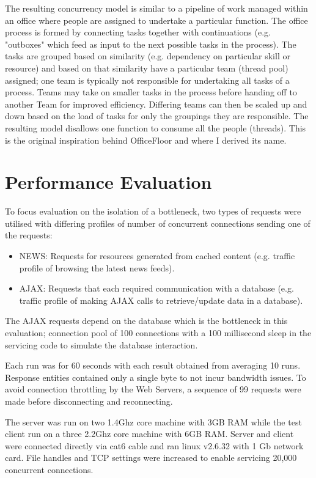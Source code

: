 \documentclass[conference]{ieee/IEEEtran}
\begin{document}
The resulting concurrency model is similar to a pipeline of work managed within
an office where people are assigned to undertake a particular function.
The office process is formed by connecting tasks together with continuations
(e.g. "outboxes" which feed as input to the next possible tasks in the process).
 The tasks are grouped based on similarity (e.g. dependency on particular skill
or resource) and based on that similarity have a particular team (thread pool)
assigned; one team is typically not responsible for undertaking all tasks of a
process.  Teams may take on smaller tasks in the process before handing off to
another Team for improved efficiency.  Differing teams can then be scaled up and
down based on the load of tasks for only the groupings they are responsible.
The resulting model disallows one function to consume all the people (threads).
This is the original inspiration behind OfficeFloor and where I derived its
name.



\section{Performance Evaluation}
To focus evaluation on the isolation of a bottleneck, two types of requests were
utilised with differing profiles of number of concurrent connections sending one
of the requests:
\begin{itemize}
\item NEWS: Requests for resources generated from cached content (e.g. traffic
profile of browsing the latest news feeds).
\item AJAX: Requests that each required communication with a database (e.g.
traffic profile of making AJAX calls to retrieve/update data in a database).
\end{itemize}

The AJAX requests depend on the database which is the bottleneck in this
evaluation; connection pool of 100 connections with a 100 millisecond sleep in
the servicing code to simulate the database interaction.

Each run was for 60 seconds with each result obtained from averaging 10 runs.
Response entities contained only a single byte to not incur bandwidth issues.
To avoid connection throttling by the Web Servers, a sequence of 99 requests
were made before disconnecting and reconnecting.

The server was run on two 1.4Ghz core machine with 3GB RAM while the test client
run on a three 2.2Ghz core machine with 6GB RAM.  Server and client were
connected directly via cat6 cable and ran linux v2.6.32 with 1 Gb network card.
File handles and TCP settings were increased to enable servicing 20,000
concurrent connections.
\end{document}
